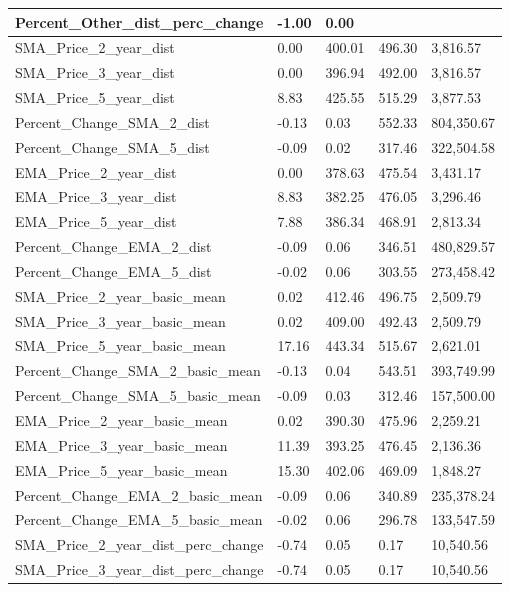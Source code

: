 \documentclass[conference,final,]{IEEEtran}
\begin{document}
\begin{table}
\begin{tabular}[t]{l|l|l|l|l}
\hline
Percent\_Other\_dist\_perc\_change & -1.00 & 0.00 &  & \\
\hline
SMA\_Price\_2\_year\_dist & 0.00 & 400.01 & 496.30 & 3,816.57\\
\hline
SMA\_Price\_3\_year\_dist & 0.00 & 396.94 & 492.00 & 3,816.57\\
\hline
SMA\_Price\_5\_year\_dist & 8.83 & 425.55 & 515.29 & 3,877.53\\
\hline
Percent\_Change\_SMA\_2\_dist & -0.13 & 0.03 & 552.33 & 804,350.67\\
\hline
Percent\_Change\_SMA\_5\_dist & -0.09 & 0.02 & 317.46 & 322,504.58\\
\hline
EMA\_Price\_2\_year\_dist & 0.00 & 378.63 & 475.54 & 3,431.17\\
\hline
EMA\_Price\_3\_year\_dist & 8.83 & 382.25 & 476.05 & 3,296.46\\
\hline
EMA\_Price\_5\_year\_dist & 7.88 & 386.34 & 468.91 & 2,813.34\\
\hline
Percent\_Change\_EMA\_2\_dist & -0.09 & 0.06 & 346.51 & 480,829.57\\
\hline
Percent\_Change\_EMA\_5\_dist & -0.02 & 0.06 & 303.55 & 273,458.42\\
\hline
SMA\_Price\_2\_year\_basic\_mean & 0.02 & 412.46 & 496.75 & 2,509.79\\
\hline
SMA\_Price\_3\_year\_basic\_mean & 0.02 & 409.00 & 492.43 & 2,509.79\\
\hline
SMA\_Price\_5\_year\_basic\_mean & 17.16 & 443.34 & 515.67 & 2,621.01\\
\hline
Percent\_Change\_SMA\_2\_basic\_mean & -0.13 & 0.04 & 543.51 & 393,749.99\\
\hline
Percent\_Change\_SMA\_5\_basic\_mean & -0.09 & 0.03 & 312.46 & 157,500.00\\
\hline
EMA\_Price\_2\_year\_basic\_mean & 0.02 & 390.30 & 475.96 & 2,259.21\\
\hline
EMA\_Price\_3\_year\_basic\_mean & 11.39 & 393.25 & 476.45 & 2,136.36\\
\hline
EMA\_Price\_5\_year\_basic\_mean & 15.30 & 402.06 & 469.09 & 1,848.27\\
\hline
Percent\_Change\_EMA\_2\_basic\_mean & -0.09 & 0.06 & 340.89 & 235,378.24\\
\hline
Percent\_Change\_EMA\_5\_basic\_mean & -0.02 & 0.06 & 296.78 & 133,547.59\\
\hline
SMA\_Price\_2\_year\_dist\_perc\_change & -0.74 & 0.05 & 0.17 & 10,540.56\\
\hline
SMA\_Price\_3\_year\_dist\_perc\_change & -0.74 & 0.05 & 0.17 & 10,540.56\\

\end{tabular}
\end{table}
\end{document}
